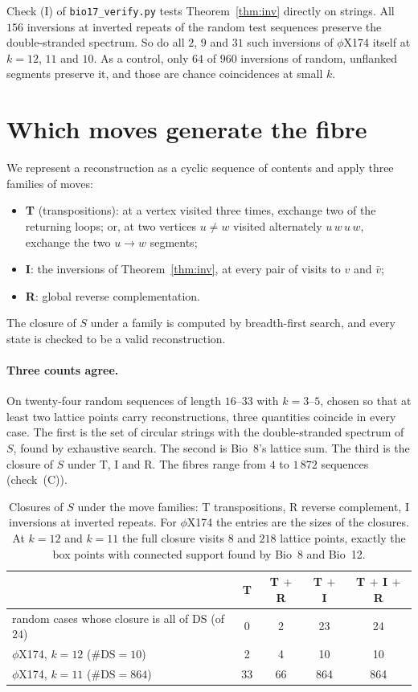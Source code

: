 \documentclass[11pt]{article}
\theoremstyle{plain}
\theoremstyle{definition}
\theoremstyle{remark}
\newcommand{\DS}{\mathrm{DS}}
\begin{document}
Check (I) of \texttt{bio17\_verify.py} tests Theorem~\ref{thm:inv} directly on strings. All $156$
inversions at inverted repeats of the random test sequences preserve the double-stranded spectrum. So
do all $2$, $9$ and $31$ such inversions of $\phi$X174 itself at $k=12$, $11$ and $10$. As a control,
only $64$ of $960$ inversions of random, unflanked segments preserve it, and those are chance
coincidences at small $k$.

\section{Which moves generate the fibre}\label{sec:gen}

We represent a reconstruction as a cyclic sequence of contents and apply three families of moves:
\begin{itemize}
\item \textbf{T} (transpositions): at a vertex visited three times, exchange two of the returning
loops; or, at two vertices $u\ne w$ visited alternately $u\,w\,u\,w$, exchange the two $u\to w$
segments;
\item \textbf{I}: the inversions of Theorem~\ref{thm:inv}, at every pair of visits to $v$ and $\bar v$;
\item \textbf{R}: global reverse complementation.
\end{itemize}
The closure of $S$ under a family is computed by breadth-first search, and every state is checked to be a
valid reconstruction.

\paragraph{Three counts agree.} On twenty-four random sequences of length $16$--$33$ with $k=3$--$5$,
chosen so that at least two lattice points carry reconstructions, three quantities coincide in every
case. The first is the set of circular strings with the double-stranded spectrum of $S$, found by
exhaustive search. The second is Bio~8's lattice sum. The third is the closure of $S$ under T, I and R.
The fibres range from $4$ to $1\,872$ sequences (check~(C)).

\begin{table}[t]
\centering\small
\begin{tabular}{lcccc}
\toprule
& T & T $+$ R & T $+$ I & T $+$ I $+$ R\\
\midrule
random cases whose closure is all of $\DS$ (of $24$) & 0 & 2 & 23 & 24\\
$\phi$X174, $k=12$ ($\#\DS=10$) & 2 & 4 & 10 & 10\\
$\phi$X174, $k=11$ ($\#\DS=864$) & 33 & 66 & 864 & 864\\
\bottomrule
\end{tabular}
\caption{Closures of $S$ under the move families: T transpositions, R reverse complement, I inversions
at inverted repeats. For $\phi$X174 the entries are the sizes of the closures. At $k=12$ and $k=11$ the full
closure visits $8$ and $218$ lattice points, exactly the box points with connected support found by
Bio~8 and Bio~12.}\label{tab:gen}
\end{table}
\end{document}
